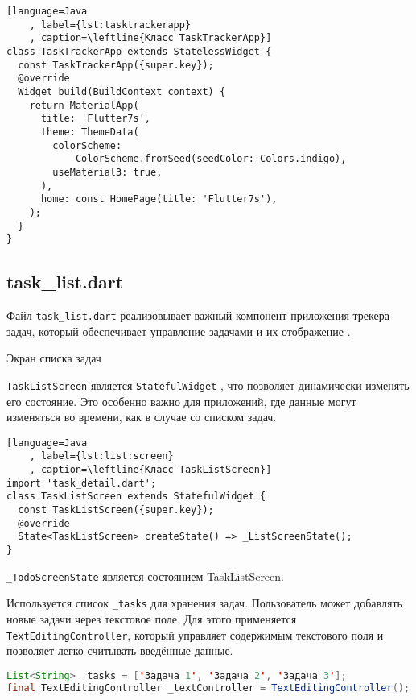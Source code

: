 \begin{lstlisting}[language=Java
	, label={lst:tasktrackerapp}
	, caption=\leftline{Класс TaskTrackerApp}]
class TaskTrackerApp extends StatelessWidget {
  const TaskTrackerApp({super.key});
  @override
  Widget build(BuildContext context) {
    return MaterialApp(
      title: 'Flutter7s',
      theme: ThemeData(
        colorScheme:
			ColorScheme.fromSeed(seedColor: Colors.indigo),
        useMaterial3: true,
      ),
      home: const HomePage(title: 'Flutter7s'),
    );
  }
}
\end{lstlisting}

\clearpage

\subsection{task\_list.dart}

Файл \texttt{task\_list.dart} реализовывает важный компонент
приложения трекера задач, который обеспечивает управление задачами
и их отображение .

\begin{image}
	\caption{Экран списка задач}
	\label{fig:list}
\end{image}

\texttt{TaskListScreen}
является \texttt{StatefulWidget} ,
что позволяет динамически изменять его состояние.
Это особенно важно для приложений,
где данные могут изменяться во времени, как в случае со списком задач.

\begin{lstlisting}[language=Java
	, label={lst:list:screen}
	, caption=\leftline{Класс TaskListScreen}]
import 'task_detail.dart';
class TaskListScreen extends StatefulWidget {
  const TaskListScreen({super.key});
  @override
  State<TaskListScreen> createState() => _ListScreenState();
}
\end{lstlisting}

\texttt{\_TodoScreenState} является состоянием TaskListScreen.\par
Используется список \texttt{\_tasks} для хранения задач.
Пользователь может добавлять новые задачи через текстовое поле.
Для этого применяется \texttt{TextEditingController},
который управляет содержимым текстового поля
и позволяет легко считывать введённые данные.

\begin{lstlisting}[language=Java
	, caption=\leftline{\_tasks и TextEditingController}]
List<String> _tasks = ['Задача 1', 'Задача 2', 'Задача 3'];
final TextEditingController _textController = TextEditingController();
\end{lstlisting}

